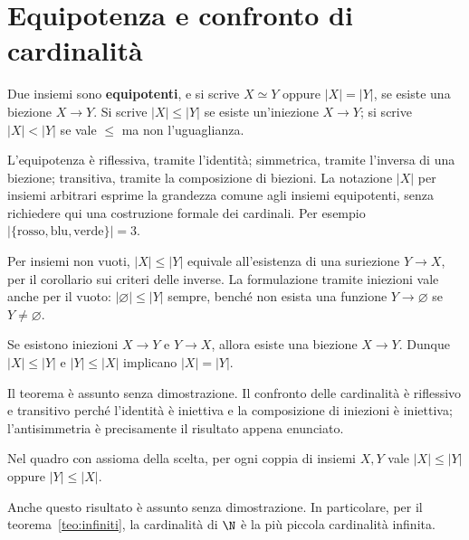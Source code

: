 \begin{schema}
\end{schema}

\section{Equipotenza e confronto di cardinalità}
\begin{definizione}
Due insiemi sono \textbf{equipotenti}, e si scrive $X\simeq Y$ oppure $|X|=|Y|$, se esiste una biezione $X\to Y$. Si scrive $|X|\le|Y|$ se esiste un'iniezione $X\to Y$; si scrive $|X|<|Y|$ se vale $\le$ ma non l'uguaglianza.
\end{definizione}

L'equipotenza è riflessiva, tramite l'identità; simmetrica, tramite l'inversa di una biezione; transitiva, tramite la composizione di biezioni. La notazione $|X|$ per insiemi arbitrari esprime la grandezza comune agli insiemi equipotenti, senza richiedere qui una costruzione formale dei cardinali. Per esempio $|\{\text{rosso},\text{blu},\text{verde}\}|=3$.

Per insiemi non vuoti, $|X|\le|Y|$ equivale all'esistenza di una suriezione $Y\to X$, per il corollario sui criteri delle inverse. La formulazione tramite iniezioni vale anche per il vuoto: $|\varnothing|\le|Y|$ sempre, benché non esista una funzione $Y\to\varnothing$ se $Y\ne\varnothing$.

\begin{teorema}\label{teo:csb}
Se esistono iniezioni $X\to Y$ e $Y\to X$, allora esiste una biezione $X\to Y$. Dunque $|X|\le|Y|$ e $|Y|\le|X|$ implicano $|X|=|Y|$.
\end{teorema}
Il teorema è assunto senza dimostrazione. Il confronto delle cardinalità è riflessivo e transitivo perché l'identità è iniettiva e la composizione di iniezioni è iniettiva; l'antisimmetria è precisamente il risultato appena enunciato.

\begin{teorema}
Nel quadro con assioma della scelta, per ogni coppia di insiemi $X,Y$ vale $|X|\le|Y|$ oppure $|Y|\le|X|$.
\end{teorema}
Anche questo risultato è assunto senza dimostrazione. In particolare, per il teorema~\ref{teo:infiniti}, la cardinalità di $\N$ è la più piccola cardinalità infinita.

